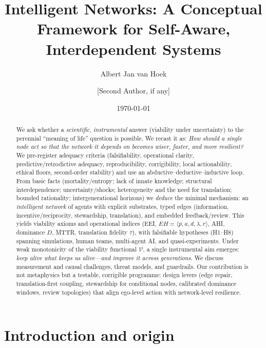 \documentclass[12pt]{article}
\title{Intelligent Networks: A Conceptual Framework for Self-Aware, Interdependent Systems}
\author{Albert Jan van Hoek \and [Second Author, if any]}
\date{\today}
\begin{document}
\renewcommand{\arraystretch}{1.2}
\setlength{\tabcolsep}{6pt}
\maketitle

\begin{abstract}
We ask whether a \emph{scientific}, \emph{instrumental} answer (viability under uncertainty) to the perennial ``meaning of life'' question is possible.
We recast it as: \emph{How should a single node act so that the network it depends on becomes wiser, faster, and more resilient?}
We pre-register adequacy criteria (falsifiability, operational clarity, predictive/retrodictive adequacy, reproducibility, corrigibility, local actionability, ethical floors, second-order stability) and use an abductive--deductive--inductive loop.
From basic facts (mortality/entropy; lack of innate knowledge; structural interdependence; uncertainty/shocks; heterogeneity and the need for translation; bounded rationality; intergenerational horizons) we \emph{deduce} the minimal mechanism: an \emph{intelligent network} of agents with explicit substrates, typed edges (information, incentive/reciprocity, stewardship, translation), and embedded feedback/review.
This yields viability axioms and operational indices (EEI, $EH=\langle p,a,d,\lambda,r\rangle$, AHI, dominance $D$, MTTR, translation fidelity $\tau$), with falsifiable hypotheses (H1--H8) spanning simulations, human teams, multi-agent AI, and quasi-experiments.
Under weak monotonicity of the viability functional $\mathcal V$, a single instrumental aim emerges: \emph{keep alive what keeps us alive---and improve it across generations}.
We discuss measurement and causal challenges, threat models, and guardrails.
Our contribution is not metaphysics but a testable, corrigible programme: design levers (edge repair, translation-first coupling, stewardship for conditional nodes, calibrated dominance windows, review topologies) that align ego-level action with network-level resilience.

\end{abstract}



\section{Introduction and origin}
\end{document}
